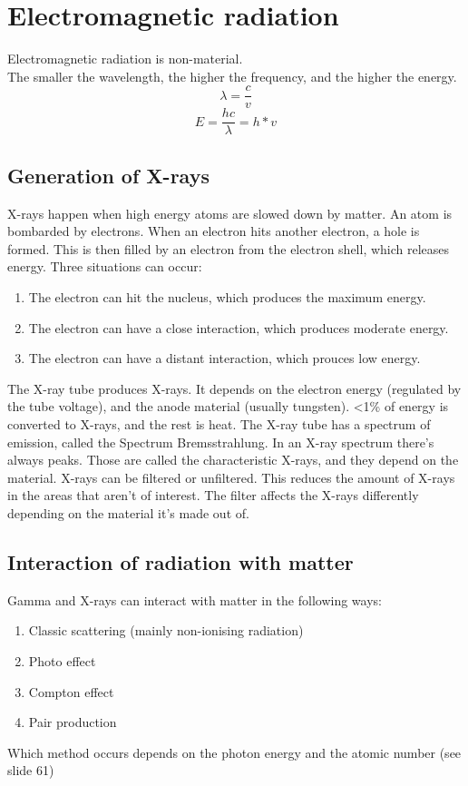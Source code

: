 \section{Electromagnetic radiation}
Electromagnetic radiation is non-material. \\
The smaller the wavelength, the higher the frequency, and the higher the energy.
\[ \lambda = \frac{c}{v} \]
\[E = \frac{hc}{\lambda} = h*v \]

\subsection{Generation of X-rays}
X-rays happen when high energy atoms are slowed down by matter. An atom is bombarded by electrons. When an electron hits another electron, a hole is formed. This is then filled by an electron from the electron shell, which releases energy. Three situations can occur: 
 \begin{enumerate}
	\item The electron can hit the nucleus, which produces the maximum energy.
	\item The electron can have a close interaction, which produces moderate energy.
	\item The electron can have a distant interaction, which prouces low energy.
\end{enumerate}
The X-ray tube produces X-rays. It depends on the electron energy (regulated by the tube voltage), and the anode material (usually tungsten). <1\% of energy is converted to X-rays, and the rest is heat. 
The X-ray tube has a spectrum of emission, called the Spectrum Bremsstrahlung.
In an X-ray spectrum there's always peaks. Those are called the characteristic X-rays, and they depend on the material. X-rays can be filtered or unfiltered. This reduces the amount of X-rays in the areas that aren't of interest. The filter affects the X-rays differently depending on the material it's made out of.

\subsection{Interaction of radiation with matter}
Gamma and X-rays can interact with matter in the following ways:
 \begin{enumerate}
	\item Classic scattering (mainly non-ionising radiation)
	\item Photo effect
	\item Compton effect
	\item Pair production
\end{enumerate}
Which method occurs depends on the photon energy and the atomic number (see slide 61)
